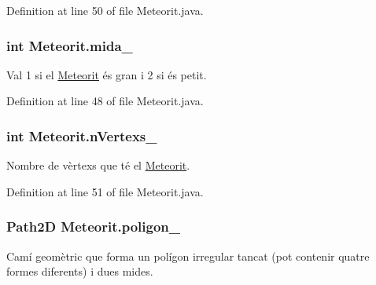 Definition at line 50 of file Meteorit.\+java.

\hypertarget{class_meteorit_a8edd607e17be6537c15ab04bfd29dc52}{}
\subsubsection[{mida\+\_\+}]{\setlength{\rightskip}{0pt plus 5cm}int Meteorit.\+mida\+\_\+\hspace{0.3cm}{\ttfamily [private]}}\label{class_meteorit_a8edd607e17be6537c15ab04bfd29dc52}


Val 1 si el \hyperlink{class_meteorit}{Meteorit} és gran i 2 si és petit. 



Definition at line 48 of file Meteorit.\+java.

\hypertarget{class_meteorit_a3b015faa09e271a0e54de95d1c9716c6}{}
\subsubsection[{n\+Vertexs\+\_\+}]{\setlength{\rightskip}{0pt plus 5cm}int Meteorit.\+n\+Vertexs\+\_\+\hspace{0.3cm}{\ttfamily [private]}}\label{class_meteorit_a3b015faa09e271a0e54de95d1c9716c6}


Nombre de vèrtexs que té el \hyperlink{class_meteorit}{Meteorit}. 



Definition at line 51 of file Meteorit.\+java.

\hypertarget{class_meteorit_a1dd8a11e4ec8c806ee66a50773daeaf7}{}
\subsubsection[{poligon\+\_\+}]{\setlength{\rightskip}{0pt plus 5cm}Path2\+D Meteorit.\+poligon\+\_\+\hspace{0.3cm}{\ttfamily [private]}}\label{class_meteorit_a1dd8a11e4ec8c806ee66a50773daeaf7}


Camí geomètric que forma un polígon irregular tancat (pot contenir quatre formes diferents) i dues mides. 



